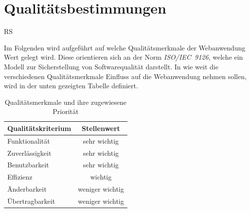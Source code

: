 \documentclass[a4paper]{scrreprt}
\begin{document}
\chapter{Qualitätsbestimmungen}
	\begin{tiny}
		RS
	\end{tiny}
	Im Folgenden wird aufgeführt auf welche Qualitätsmerkmale der Webanwendung Wert gelegt wird. Diese orientieren sich an der Norm \textit{ISO/IEC~9126}, welche ein Modell zur Sicherstellung von Softwarequalität darstellt. In wie weit die verschiedenen Qualitätsmerkmale Einfluss auf die Webanwendung nehmen sollen, wird in der unten gezeigten Tabelle definiert.\\

	\begin{table}[h]
 
	    \begin{center}
		    \begin{tabular}{|l|c|}
			    \hline 
			    \rule[-1ex]{0pt}{2.5ex} \textbf{Qualitätskriterium} & \textbf{Stellenwert} \\ 
			    \hline 
			    \rule[-1ex]{0pt}{2.5ex} Funktionalität & sehr wichtig \\ 
			    \hline 
			    \rule[-1ex]{0pt}{2.5ex} Zuverlässigkeit & sehr wichtig \\ 
			    \hline 
			    \rule[-1ex]{0pt}{2.5ex} Benutzbarkeit & sehr wichtig \\ 
			    \hline 
			    \rule[-1ex]{0pt}{2.5ex} Effizienz & wichtig \\ 
			    \hline 
			    \rule[-1ex]{0pt}{2.5ex} Änderbarkeit & weniger wichtig \\ 
			    \hline 
			    \rule[-1ex]{0pt}{2.5ex} Übertragbarkeit & weniger wichtig \\ 
			    \hline   
		    \end{tabular}  
	    \end{center}
	    \caption{Qualitätsmerkmale und ihre zugewiesene Priorität}
	\end{table}
\end{document}
